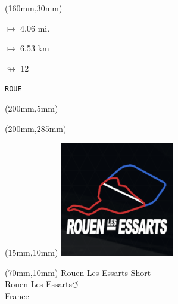 \begin{textblock*}{40mm}(160mm,30mm)%
\Large
\par$\mapsto$ 4.06 mi.
\par$\mapsto$ 6.53 km
\par$\looparrowright$ 12
\par\hfill\tiny\tt ROUE\\
\end{textblock*}
\begin{textblock*}{20mm}(200mm,5mm)%
\fbox{\thepage}
\label{ROUE}
\end{textblock*}
\begin{textblock*}{20mm}(200mm,285mm)%
\fbox{\thepage}
\end{textblock*}

\null\newpage
\begin{textblock*}{50mm}(15mm,10mm)%
\includegraphics[width=50mm]{LG/ROUE.png}
\end{textblock*}
\begin{textblock*}{130mm}(70mm,10mm)%
{\fontsize{20}{20}\selectfont Rouen Les Essarts Short\\}
{\fontsize{16}{16}\selectfont Rouen Les Essarts\hfill \huge$\circlearrowleft$\\}
{\fontsize{12}{12}\selectfont France\\}
\end{textblock*}
